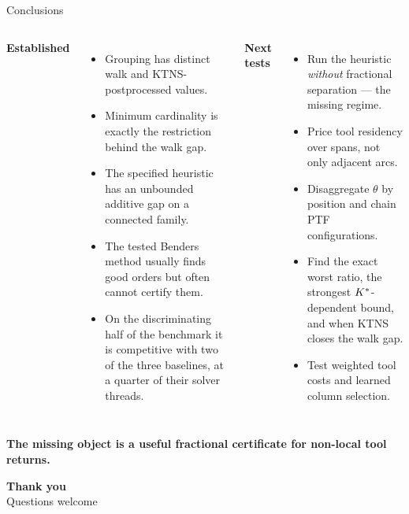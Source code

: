 \begin{frame}{Conclusions}
\vspace{0.13cm}
\begin{columns}[T,onlytextwidth]
\textbf{Established}\\[.12cm]
{\small
\begin{itemize}\itemsep3pt
  \item Grouping has distinct walk and KTNS-postprocessed values.
  \item Minimum cardinality is exactly the restriction behind the walk gap.
  \item The specified heuristic has an unbounded additive gap on a connected family.
  \item The tested Benders method usually finds good orders but often cannot certify them.
  \item On the discriminating half of the benchmark it is competitive with two of the
        three baselines, at a quarter of their solver threads.
\end{itemize}}

\textbf{Next tests}\\[.12cm]
{\small
\begin{itemize}\itemsep3pt
  \item Run the heuristic \emph{without} fractional separation --- the missing regime.
  \item Price tool residency over spans, not only adjacent arcs.
  \item Disaggregate $\theta$ by position and chain PTF configurations.
  \item Find the exact worst ratio, the strongest $K^{\ast}$-dependent bound, and when
        KTNS closes the walk gap.
  \item Test weighted tool costs and learned column selection.
\end{itemize}}
\end{columns}
\vspace{0.23cm}
\centering
\textbf{The missing object is a useful fractional certificate for non-local tool returns.}

\end{frame}


\begin{frame}[plain]
\vfill
\begingroup\centering
{\Huge\color{navy}\bfseries Thank you}\\[1.0cm]
{\large\color{muted} Questions welcome}
\par\endgroup
\vfill
\end{frame}
